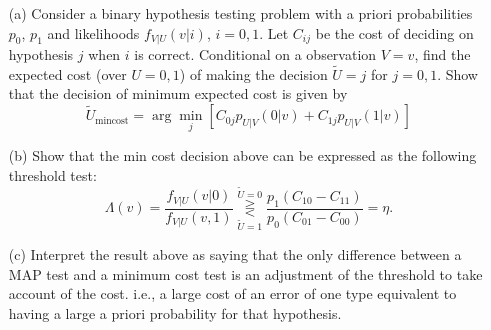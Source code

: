 \documentclass{assignment}
\begin{document}
\begin{prob}
    \begin{itemize}
        \item[(a)] Consider a binary hypothesis testing problem with a priori probabilities $p_0$, $p_1$ and likelihoods $f_{V\vert U}(v\vert i)$, $i=0,1$. Let $C_{ij}$ be the cost of deciding on hypothesis $j$ when $i$ is correct. Conditional on a observation $V=v$, find the expected cost (over $U=0,1$) of making the decision $\tilde{U}=j$ for $j=0,1$. Show that the decision of minimum expected cost is given by
        \[
            \tilde{U}_{\text{mincost}}=\arg\min_j\left[C_{0j}p_{U\vert V}(0\vert v)+C_{1j}p_{U\vert V}(1\vert v)\right]
        \]
        \item[(b)] Show that the min cost decision above can be expressed as the following threshold test:
        \[
            \Lambda(v)=\frac{f_{V\vert U}(v\vert 0)}{f_{V\vert U}(v,1)}\overset{\tilde{U}=0}{\underset{\tilde{U}=1}{\gtreqless}}\frac{p_1(C_{10}-C_{11})}{p_0(C_{01}-C_{00})}=\eta.
        \]
        \item[(c)] Interpret the result above as saying that the only difference between a MAP test and a minimum cost test is an adjustment of the threshold to take account of the cost. i.e., a large cost of an error of one type equivalent to having a large a priori probability for that hypothesis.
    \end{itemize}
\end{prob}
\end{document}
